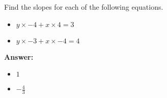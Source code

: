  Find the slopes for each of the following equations. \begin{itemize}\item \( y \times -4 + x \times 4 = 3 \)\item \( y \times -3 + x \times -4 = 4 \)\end{itemize}

        \textbf{Answer:} \begin{itemize}\item \( 1 \)\item \( -\frac{4}{3} \)\end{itemize}
